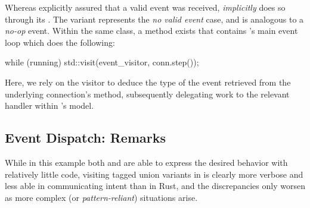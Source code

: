 Whereas \wmrs explicitly assured that a valid event was received, \wmcpp
\textit{implicitly} does so through its . The
 variant represents the \textit{no valid event} case, and
is analogous to a \textit{no-op} event. Within the same class, a method exists
that contains \mbox{\wmcpp}'s main event loop which does the following:

\begin{cppblock}
  while (running)
    std::visit(event_visitor, conn.step());
\end{cppblock}

Here, we rely on the visitor to deduce the type of the event retrieved from the
underlying connection's  method, subsequently delegating work to the
relevant handler within \wmcpp's model.

\subsection{Event Dispatch: Remarks}

While in this example both \wmrs and \wmcpp are able to express the desired
behavior with relatively little code, visiting tagged union variants in \cpp is
clearly more verbose and less able in communicating intent than in Rust, and
the discrepancies only worsen as more complex (or \textit{pattern-reliant})
situations arise\cite{stdvisitwrong}.
